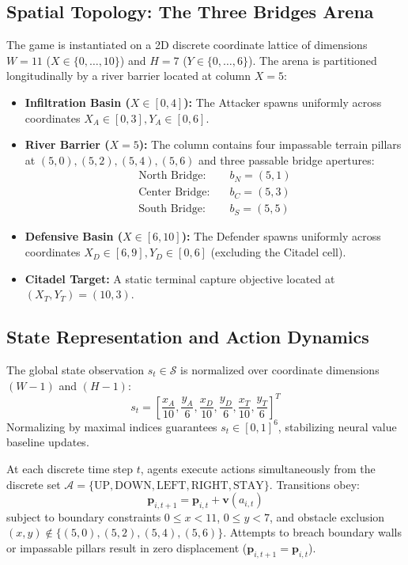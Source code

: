 \documentclass[conference]{IEEEtran}
\begin{document}
\subsection{Spatial Topology: The Three Bridges Arena}
The game is instantiated on a 2D discrete coordinate lattice of dimensions $W = 11$ ($X \in \{0, \dots, 10\}$) and $H = 7$ ($Y \in \{0, \dots, 6\}$). The arena is partitioned longitudinally by a river barrier located at column $X = 5$:
\begin{itemize}
    \item \textbf{Infiltration Basin ($X \in [0, 4]$):} The Attacker spawns uniformly across coordinates $X_A \in [0, 3], Y_A \in [0, 6]$.
    \item \textbf{River Barrier ($X = 5$):} The column contains four impassable terrain pillars at $(5, 0), (5, 2), (5, 4), (5, 6)$ and three passable bridge apertures:
    \begin{align}
    \text{North Bridge:} \quad & b_N = (5, 1) \\
    \text{Center Bridge:} \quad & b_C = (5, 3) \\
    \text{South Bridge:} \quad & b_S = (5, 5)
    \end{align}
    \item \textbf{Defensive Basin ($X \in [6, 10]$):} The Defender spawns uniformly across coordinates $X_D \in [6, 9], Y_D \in [0, 6]$ (excluding the Citadel cell).
    \item \textbf{Citadel Target:} A static terminal capture objective located at $(X_T, Y_T) = (10, 3)$.
\end{itemize}

\subsection{State Representation and Action Dynamics}
The global state observation $s_t \in \mathcal{S}$ is normalized over coordinate dimensions $(W-1)$ and $(H-1)$:
\begin{equation}
s_t = \left[ \frac{x_A}{10}, \frac{y_A}{6}, \frac{x_D}{10}, \frac{y_D}{6}, \frac{x_T}{10}, \frac{y_T}{6} \right]^T
\end{equation}
Normalizing by maximal indices guarantees $s_t \in [0, 1]^6$, stabilizing neural value baseline updates.

At each discrete time step $t$, agents execute actions simultaneously from the discrete set $\mathcal{A} = \{\text{UP}, \text{DOWN}, \text{LEFT}, \text{RIGHT}, \text{STAY}\}$. Transitions obey:
\begin{equation}
\bm{p}_{i, t+1} = \bm{p}_{i, t} + \bm{v}(a_{i, t})
\end{equation}
subject to boundary constraints $0 \le x < 11$, $0 \le y < 7$, and obstacle exclusion $(x, y) \notin \{(5, 0), (5, 2), (5, 4), (5, 6)\}$. Attempts to breach boundary walls or impassable pillars result in zero displacement ($\bm{p}_{i, t+1} = \bm{p}_{i, t}$).
\end{document}
